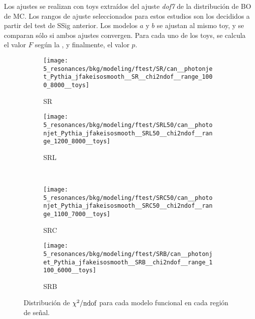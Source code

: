 Los ajustes se realizan con toys extraídos del ajuste \textit{dof7} de la distribución de \ac{BO} de \ac{MC}. Los rangos de ajuste seleccionados para estos estudios son los decididos a partir del test de \ac{SSig} anterior. Los modelos \(a\) y \(b\) se ajustan al mismo toy, y se comparan sólo si ambos ajustes convergen. Para cada uno de los toys, se calcula el valor \(F\) según la \Eqn{\ref{eq:bkg:modeling:preparation:ftest:ftest}}, y finalmente, el valor \(p\).



\begin{figure}[ht!]
    \centering
    \begin{subfigure}[h]{0.49\linewidth}
        \centering
        \texttt{[image: 5\_resonances/bkg/modeling/ftest/SR/can\_\_photonjet\_Pythia\_jfakeisosmooth\_\_SR\_\_chi2ndof\_\_range\_1000\_8000\_\_toys]}
        \caption{SR}
    \end{subfigure}
    \begin{subfigure}[h]{0.49\linewidth}
        \centering
        \texttt{[image: 5\_resonances/bkg/modeling/ftest/SRL50/can\_\_photonjet\_Pythia\_jfakeisosmooth\_\_SRL50\_\_chi2ndof\_\_range\_1200\_8000\_\_toys]}
        \caption{SRL}
    \end{subfigure}
    \\
    \begin{subfigure}[h]{0.49\linewidth}
        \centering
        \texttt{[image: 5\_resonances/bkg/modeling/ftest/SRC50/can\_\_photonjet\_Pythia\_jfakeisosmooth\_\_SRC50\_\_chi2ndof\_\_range\_1100\_7000\_\_toys]}
        \caption{SRC}
    \end{subfigure}
    \begin{subfigure}[h]{0.49\linewidth}
        \centering
        \texttt{[image: 5\_resonances/bkg/modeling/ftest/SRB/can\_\_photonjet\_Pythia\_jfakeisosmooth\_\_SRB\_\_chi2ndof\_\_range\_1100\_6000\_\_toys]}
        \caption{SRB}
    \end{subfigure}
    \caption{Distribución de \(\chi^{2} / \text{ndof}\) para cada modelo funcional en cada región de se\~nal.}
    \label{fig:bkg:modeling:preparation:ftest:chi2ndof}
\end{figure}

